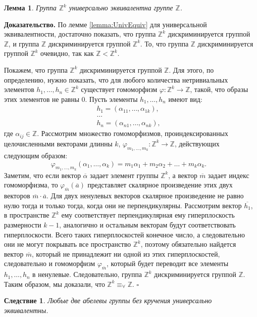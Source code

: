\documentclass[a4paper,11pt,twoside]{article}
\newtheorem{lemma}{Лемма}[section]
\newtheorem{corollary}{Следствие}[section]
\def\Z{{\mathbb{Z}}}
\begin{document}
\begin{lemma}\label{lemma:UnivEquivZk}
Группа $\Z^k$ универсально эквивалентна группе $\Z$.
\end{lemma}

{\bf Доказательство.} По лемме \ref{lemma:UnivEquiv} для универсальной эквивалентности, достаточно показать, что группа $\Z^k$ дискриминируется группой $\Z$, и группа $\Z$ дискриминируется группой $\Z^k$. То, что группа $\Z$ дискриминируется группой $\Z^k$ очевидно, так как $\Z < \Z^k$. 

Покажем, что группа $\Z^k$ дискриминируется группой $\Z$. Для этого, по определению, нужно показать, что для любого количества нетривиальных элементов $h_1, \ldots, h_n \in \Z^k$ существует гомоморфизм $\varphi : \Z^k \rightarrow \Z$, такой, что образы этих элементов не равны 0. Пусть элементы $h_1, \ldots, h_n$ имеют вид:
$$\begin{array}{c}
 h_1 = (\alpha_{11}, \ldots, \alpha_{1k}), \\
 \ldots \\
 h_n = (\alpha_{n1}, \ldots, \alpha_{nk}),
 \end{array} $$
где $\alpha_{ij} \in \Z$. Рассмотрим множество гомоморфизмов, проиндексированных целочисленными векторами длинны $k$, $\varphi_{m_1,\ldots,m_k} : \Z^k \rightarrow \Z$, действующих следующим образом:
$$\varphi_{m_1,\ldots,m_k} (\alpha_1, \ldots, \alpha_k) = m_1 \alpha_1 + m_2 \alpha_2 + \ldots + m_k \alpha_k.$$
Заметим, что если вектор $\overline{\alpha}$ задает элемент группы $\Z^k$, а вектор $\overline{m}$ задает индекс гомоморфизма, то $\varphi_{\overline{m}}(\overline{a})$ представляет скалярное произведение этих двух векторов $\overline{m} \cdot \overline{a}$. Для двух ненулевых векторов скалярное произведение не равно нулю тогда и только тогда, когда они не перпендикулярны. Рассмотрим вектор $\overline{h_1}$, в пространстве $\Z^k$ ему соответствует перпендикулярная ему гиперплоскость размерности $k-1$, аналогично и остальным векторам будут соответствовать гиперплоскости. Всего таких гиперплоскостей конечное число, а следовательно они не могут покрывать все пространство $\Z^k$, поэтому обязательно найдется вектор $\overline{m}$, который не принадлежит ни одной из этих гиперплоскостей, следовательно и гомоморфизм $\varphi_{\overline{m}}$, который будет переводит все элементы $h_1,\ldots, h_n$ в ненулевые. Следовательно, группа $\Z^k$ дискриминируется группой $\Z$. Таким образом, мы доказали, что $\Z^k \equiv_{\forall} \Z$. $\square$


\begin{corollary}\label{corollaty:AbelUnivEquiv}
Любые две абелевы группы без кручения универсально эквивалентны.
\end{corollary}
\end{document}
